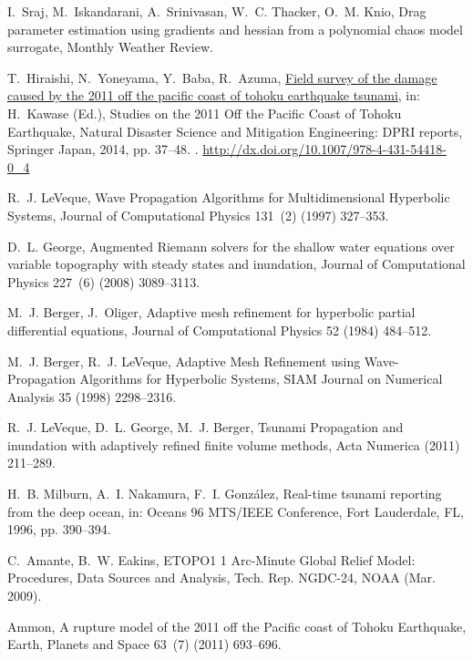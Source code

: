 \documentclass[review,12pt]{elsarticle}
\begin{document}
\begin{thebibliography}{10}
I.~Sraj, M.~Iskandarani, A.~Srinivasan, W.~C. Thacker, O.~M. Knio, Drag
  parameter estimation using gradients and hessian from a polynomial chaos
  model surrogate, Monthly Weather Review.

T.~Hiraishi, N.~Yoneyama, Y.~Baba, R.~Azuma,
  \href{http://dx.doi.org/10.1007/978-4-431-54418-0_4}{Field survey of the
  damage caused by the 2011 off the pacific coast of tohoku earthquake
  tsunami}, in: H.~Kawase (Ed.), Studies on the 2011 Off the Pacific Coast of
  Tohoku Earthquake, Natural Disaster Science and Mitigation Engineering: DPRI
  reports, Springer Japan, 2014, pp. 37--48.
\newblock \href {http://dx.doi.org/10.1007/978-4-431-54418-0_4}
  {}.
\newline\urlprefix\url{http://dx.doi.org/10.1007/978-4-431-54418-0_4}

R.~J. LeVeque, {Wave Propagation Algorithms for Multidimensional Hyperbolic
  Systems}, Journal of Computational Physics 131~(2) (1997) 327--353.

D.~L. George, {Augmented Riemann solvers for the shallow water equations over
  variable topography with steady states and inundation}, Journal of
  Computational Physics 227~(6) (2008) 3089--3113.

M.~J. Berger, J.~Oliger, {Adaptive mesh refinement for hyperbolic partial
  differential equations}, Journal of Computational Physics 52 (1984) 484--512.

M.~J. Berger, R.~J. LeVeque, {Adaptive Mesh Refinement using Wave-Propagation
  Algorithms for Hyperbolic Systems}, SIAM Journal on Numerical Analysis 35
  (1998) 2298--2316.

R.~J. LeVeque, D.~L. George, M.~J. Berger, {Tsunami Propagation and inundation
  with adaptively refined finite volume methods}, Acta Numerica (2011)
  211--289.

H.~B. Milburn, A.~I. Nakamura, F.~I. Gonz{\'a}lez, {Real-time tsunami reporting
  from the deep ocean}, in: Oceans 96 MTS/IEEE Conference, Fort Lauderdale, FL,
  1996, pp. 390--394.

C.~Amante, B.~W. Eakins, {ETOPO1 1 Arc-Minute Global Relief Model: Procedures,
  Data Sources and Analysis}, Tech. Rep. NGDC-24, NOAA (Mar. 2009).

Ammon, {A rupture model of the 2011 off the Pacific coast of Tohoku
  Earthquake}, Earth, Planets and Space 63~(7) (2011) 693--696.


\end{thebibliography}
\end{document}
